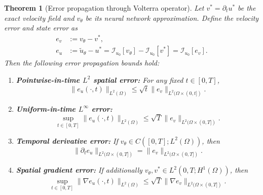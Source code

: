 \documentclass[11pt,reqno]{amsart}
\theoremstyle{plain}
\newtheorem{theorem}{Theorem}[section]
\theoremstyle{definition}
\theoremstyle{remark}
\begin{document}
\begin{theorem}[Error propagation through Volterra operator]\label{thm:volterra_error_propagation}
Let $v^* = \partial_t u^*$ be the exact velocity field and $v_\theta$ be its neural network approximation. Define the velocity error and state error as
\begin{align}
    e_v &:= v_\theta - v^*, \\
    e_u &:= \tilde{u}_\theta - u^* = \mathcal{I}_{u_0}[v_\theta] - \mathcal{I}_{u_0}[v^*] = \mathcal{I}_{u_0}[e_v].
\end{align}
Then the following error propagation bounds hold:

\begin{enumerate}[label=(\alph*)]
    \item \textbf{Pointwise-in-time $L^2$ spatial error:} For any fixed $t \in [0,T]$,
    \begin{equation}\label{eq:volterra_l2_error}
        \|e_u(\cdot, t)\|_{L^2(\Omega)} \leq \sqrt{t} \|e_v\|_{L^2(\Omega \times (0,t])}.
    \end{equation}
    
    \item \textbf{Uniform-in-time $L^\infty$ error:} 
    \begin{equation}\label{eq:volterra_linf_error}
        \sup_{t \in [0,T]} \|e_u(\cdot, t)\|_{L^2(\Omega)} \leq \sqrt{T} \|e_v\|_{L^2(\Omega \times (0,T])}.
    \end{equation}
    
    \item \textbf{Temporal derivative error:} If $v_\theta \in C([0,T]; L^2(\Omega))$, then
    \begin{equation}\label{eq:derivative_error}
        \|\partial_t e_u\|_{L^2(\Omega \times (0,T])} = \|e_v\|_{L^2(\Omega \times (0,T])}.
    \end{equation}
    
    \item \textbf{Spatial gradient error:} If additionally $v_\theta, v^* \in L^2(0,T; H^1(\Omega))$, then
    \begin{equation}\label{eq:gradient_error}
        \sup_{t \in [0,T]} \|\nabla e_u(\cdot, t)\|_{L^2(\Omega)} \leq \sqrt{T} \|\nabla e_v\|_{L^2(\Omega \times (0,T])}.
    \end{equation}
\end{enumerate}
\end{theorem}
\end{document}
